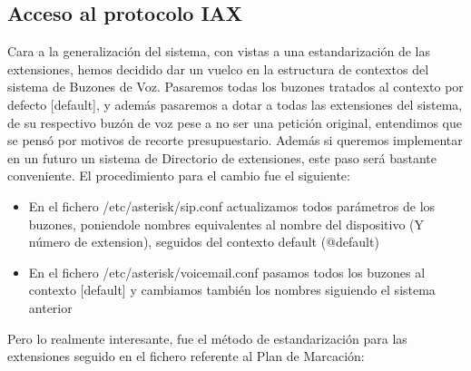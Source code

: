 \newpage

\color[rgb]{0,0,0}

\subsection{Acceso al protocolo IAX}

Cara a la generalización del sistema, con vistas a una estandarización de las extensiones, hemos decidido dar un vuelco en la estructura de contextos del sistema de Buzones de Voz. Pasaremos todas los buzones tratados al contexto por defecto [default], y además pasaremos a dotar a todas las extensiones del sistema, de su respectivo buzón de voz pese a no ser una petición original, entendimos que se pensó por motivos de recorte presupuestario. Además si queremos implementar en un futuro un sistema de Directorio de extensiones, este paso será bastante conveniente. El procedimiento para el cambio fue el siguiente:

\begin{itemize}

\item En el fichero /etc/asterisk/sip.conf actualizamos todos parámetros de los buzones, poniendole nombres equivalentes al nombre del dispositivo (Y número de extension), seguidos del contexto default (@default)
\item En el fichero /etc/asterisk/voicemail.conf pasamos todos los buzones al contexto [default] y cambiamos también los nombres siguiendo el sistema anterior

\end{itemize}

Pero lo realmente interesante, fue el método de estandarización para las extensiones seguido en el fichero referente al Plan de Marcación:

